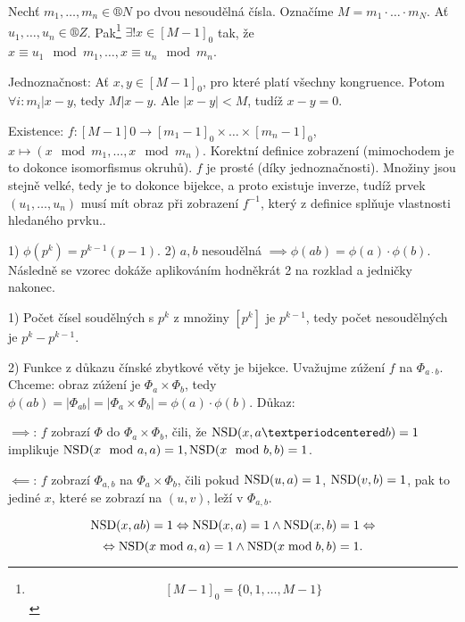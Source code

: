 \documentclass[12pt]{article}                   %
\begin{document}
        \begin{veta}
            Nechť $m_1, …, m_n \in ®N$ po dvou nesoudělná čísla. Označíme $M = m_1·…·m_N$. Ať $u_1, …, u_n \in ®Z$. Pak\footnote{$$ [M-1]_0 = \{0, 1, …, M-1\} $$ } $\exists! x \in [M-1]_0$ tak, že $x ≡ u_1 \mod m_1, …, x ≡ u_n \mod m_n$.

            \begin{dukazin}
                Jednoznačnost: Ať $x, y \in [M-1]_0$, pro které platí všechny kongruence. Potom $\forall i: m_i | x - y$, tedy $M | x - y$. Ale $|x - y| < M$, tudíž $x - y = 0$.

                Existence: $f: [M-1]0 \rightarrow [m_1-1]_0 \times … \times [m_n - 1]_0$, $x \mapsto (x \mod m_1, …, x \mod m_n)$. Korektní definice zobrazení (mimochodem je to dokonce isomorfismus okruhů). $f$ je prosté (díky jednoznačnosti). Množiny jsou stejně velké, tedy je to dokonce bijekce, a proto existuje inverze, tudíž prvek $(u_1, …, u_n)$ musí mít obraz při zobrazení $f^{-1}$, který z definice splňuje vlastnosti hledaného prvku..
            \end{dukazin}
        \end{veta}

        \begin{dukaz}
            1) $\phi(p^k) = p^{k-1}(p-1)$. 2) $a, b$ nesoudělná $\implies \phi(ab) = \phi(a)·\phi(b)$. Následně se vzorec dokáže aplikováním hodněkrát 2 na rozklad a jedničky nakonec.

            1) Počet čísel soudělných s $p^k$ z množiny $[p^k]$ je $p^{k-1}$, tedy počet nesoudělných je $p^k - p^{k-1}$.

            2) Funkce z důkazu čínské zbytkové věty je bijekce. Uvažujme zúžení $f$ na $\Phi_{a·b}$. Chceme: obraz zúžení je $\Phi_a \times \Phi_b$, tedy $\phi(ab) = |\Phi_{ab}| = |\Phi_a \times \Phi_b| = \phi(a)·\phi(b)$. Důkaz:

            $\implies$: $f$ zobrazí $\Phi$ do $\Phi_a \times \Phi_b$, čili, že $\NSD(x, a·b) = 1$ implikuje $\operatorname{NSD}(x \mod a, a) = 1, \operatorname{NSD}(x \mod b, b) = 1$.

            $\impliedby$: $f$ zobrazí $\Phi_{a, b}$ na $\Phi_a \times \Phi_b$, čili pokud $\operatorname{NSD}(u, a) = 1$, $\operatorname{NSD}(v, b) = 1$, pak to jediné $x$, které se zobrazí na $(u, v)$, leží v $\Phi_{a, b}$.

            $$ \operatorname{NSD}(x, ab) = 1 \Leftrightarrow \operatorname{NSD}(x, a) = 1 \land \operatorname{NSD}(x, b) = 1 \Leftrightarrow $$
            $$ \Leftrightarrow \operatorname{NSD}(x \bmod a, a) = 1 \land \operatorname{NSD}(x \bmod b, b) = 1. $$ 
        \end{dukaz}
\end{document}

